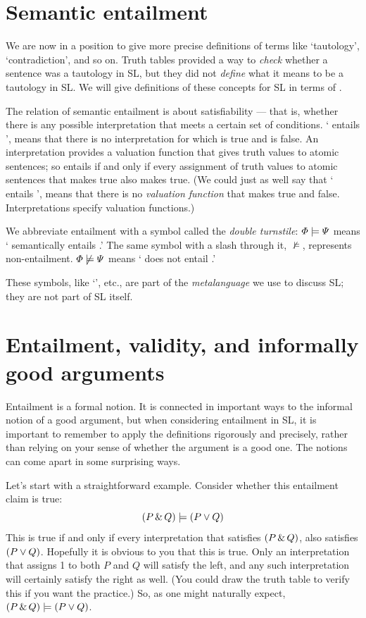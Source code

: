 \section{Semantic entailment}

We are now in a position to give more precise definitions of terms like `tautology', `contradiction', and so on. Truth tables provided a way to \emph{check} whether a sentence was a tautology in SL, but they did not \emph{define} what it means to be a tautology in SL. We will give definitions of these concepts for SL in terms of .

The relation of semantic entailment is about satisfiability --- that is, whether there is any possible interpretation that meets a certain set of conditions. `\metaA{} entails \metaB{}', means that there is no interpretation for which \metaA{} is true and \metaB{} is false. An interpretation provides a valuation function that gives truth values to atomic sentences; so \metaA{} entails \metaB{} if and only if every assignment of truth values to atomic sentences that makes \metaA{} true also makes \metaB{} true. (We could just as well say that  `\metaA{} entails \metaB{}', means that there is no \emph{valuation function} that makes \metaA{} true and \metaB{} false. Interpretations specify valuation functions.)

We abbreviate entailment with a symbol called the \emph{double turnstile}:
$\varPhi{}\models\varPsi{}$ means `\metaA{} semantically entails \metaB{}.' The same symbol with a slash through it, $\not\models$, represents non-entailment. $\varPhi{}\not\models\varPsi{}$ means `\metaA{} does not entail \metaB{}.'

These symbols, like `\metaA{}', etc., are part of the \emph{metalanguage} we use to discuss SL; they are not part of SL itself.

\section{Entailment, validity, and informally good arguments}

Entailment is a formal notion. It is connected in important ways to the informal notion of a good argument, but when considering entailment in SL, it is important to remember to apply the definitions rigorously and precisely, rather than relying on your sense of whether the argument is a good one. The notions can come apart in some surprising ways.

Let's start with a straightforward example. Consider whether this entailment claim is true: $$(P\,\&\, Q) \models (P\vee Q)$$ This is true if and only if every interpretation that satisfies $(P\,\&\, Q)$, also satisfies  $(P\vee Q)$. Hopefully it is obvious to you that this is true. Only an interpretation that assigns 1 to both $P$ and $Q$ will satisfy the left, and any such interpretation will certainly satisfy the right as well. (You could draw the truth table to verify this if you want the practice.) So, as one might naturally expect, $(P\,\&\, Q) \models (P\vee Q)$.

